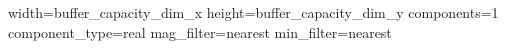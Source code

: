 width={{buffer_capacity_dim_x}}
height={{buffer_capacity_dim_y}}
components=1
component_type=real
mag_filter=nearest
min_filter=nearest
